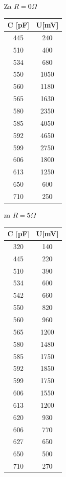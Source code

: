 \documentclass[a4paper]{report}
\begin{document}
Za $R = 0 \Omega$
\begin{center}
	\begin{tabular}{ |c|c| } 
 \hline
 C [pF] & U[mV] \\
 \hline
 	445   & 240 \\
    510   & 400 \\
    534   & 680 \\
    550   & 1050 \\
    560   & 1180 \\
    565   & 1630 \\
    580   & 2350 \\
    585   & 4050 \\
    592   & 4650 \\
    599   & 2750 \\
    606   & 1800 \\
    613   & 1250 \\
    650   & 600 \\
    710   & 250 \\
 \hline
	\end{tabular}
\end{center}



za $R = 5 \Omega$
\begin{center}
	\begin{tabular}{ |c|c| } 
 \hline
 C [pF] & U[mV] \\
 \hline
 	320   & 140 \\
    445   & 220 \\
    510   & 390 \\
    534   & 600 \\
    542   & 660 \\
    550   & 820 \\
    560   & 960 \\
    565   & 1200 \\
    580   & 1480 \\
    585   & 1750 \\
    592   & 1850 \\
    599   & 1750 \\
    606   & 1550 \\
    613   & 1200 \\
    620   & 930 \\
    606   & 770 \\
    627   & 650 \\
    650   & 500 \\
    710   & 270 \\
 \hline
	\end{tabular}
	\end{center}
\end{document}
